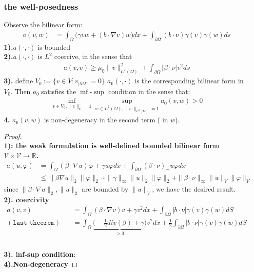 


\subsubsection*{the well-posedness}
\begin{lemma}
Observe the bilinear form:
\begin{align*}
		a(v, w) &= \int_\Omega \bigg(\gamma v w + (b \cdot \nabla v) w \bigg) dx 
		+ \int_{\partial\Omega} (b \cdot  \nu) \gamma(v) \gamma(w) ds
\end{align*}
\textbf{1).}$a(\cdot, \cdot)$ is bounded\\
\textbf{2).}$a(\cdot, \cdot)$ is $L^2$ coercive, in the sense that
\begin{align*}
	a(v, v) \geq \mu_0 \|v\|^2_{L^2(\Omega)} + \int_{\partial \Omega }|\beta \cdot \nu | v^2 ds
\end{align*}
\textbf{3).}
define $V_0 := \{ v \in V:  v_{|\partial \Omega^- } = 0 \}$	
$a_0(\cdot, \cdot)$ is the corresponding bilinear form in $V_0$. Then $a_0$ satisfies the $\inf$-$\sup$ condition in the sense that:
\begin{align*}
	\inf_{v \in V_0, \|v\|_V = 1} \sup_{w \in L^2(\Omega), \|w\|_{L^2(\Omega)} = 1} a_0(v, w) >0
\end{align*}
\textbf{4.}
$a_0(v, w)$ is non-degeneracy in the second term ( in $w$).
\end{lemma}
\begin{proof}
\quad\\
\textbf{1): the weak formulation is well-defined bounded bilinear form $\mathcal{V} \times \mathcal{V} \rightarrow \mathbb{R}$. }
\begin{align*}
	a(u, \varphi) &= \int_\Omega (\beta \cdot  \nabla u) \varphi + \gamma u \varphi dx + \int_{\partial\Omega} (\beta \cdot \nu)_- u\varphi dx \\
	&\le \|\beta \nabla u\|_2\|\varphi\|_2 + \|\gamma\|_\infty \|u\|_2\|\varphi\|_2 + \|\beta \cdot \nu \|_\infty \|u\|_V \|\varphi\|_V
\end{align*}
since $\|\beta \cdot \nabla u\|_2, \|u\|_2$ are bounded by $\|u\|_V$, we have the desired result. \\
\textbf{2). coercivity}
\begin{align*}
	a(v, v) &= \int_\Omega (\beta \cdot \nabla v) v + \gamma v^2 dx + \int_{\partial\Omega} |b \cdot \nu| \gamma(v) \gamma(w)dS \\
	(\texttt{last theorem}) \quad
	&= \int_\Omega \underbrace{ \bigg(-\frac{1}{2} div(\beta) +  \gamma\bigg)}_{> 0 } v^2 dx + \frac{1}{2}\int_{\partial\Omega} |b \cdot \nu| \gamma(v) \gamma(w)dS \\
\end{align*}
\quad\\
\textbf{3). inf-sup condition}:\\
\textbf{4).Non-degeneracy}


\end{proof}
\quad\\

